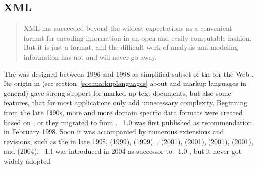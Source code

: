 \subsection{XML}
\label{sec:xml}

\begin{quotation}%
XML has succeeded beyond the wildest expectations as a convenient format
for encoding information in an open and easily computable fashion. But it 
is just a format, and the difficult work of analysis and modeling 
information has not and will never go away.
\\\quotationsource \textcite{Wilde2008}
\end{quotation}

\noindent
The  was designed between 1996
and 1998 as simplified subset of the  for the Web \cite{Bray1998}. Its origin in 
 (see section~\ref{sec:markuplanguages} about  and 
markup languages in general) gave  strong support for marked
up text documents, but also some features, that for most applications 
only add unnecessary complexity. Beginning from the late 1990s, more and 
more domain specific data formats were created based on , or they
migrated to  from . ~1.0 was first published
as  recommendation in February 1998. Soon it was accompanied 
by numerous extensions and revisions, such as the
 in late 1998,
 (1999),
 (1999),
 \cite{Clark1999x},  %
 (2001), %
 (2001), %
 (2001), %
 (2001), %
and  (2004). %
~1.1 was introduced in 2004 as successor to ~1.0
\cite{Bray2004}, but it never got widely adopted.
